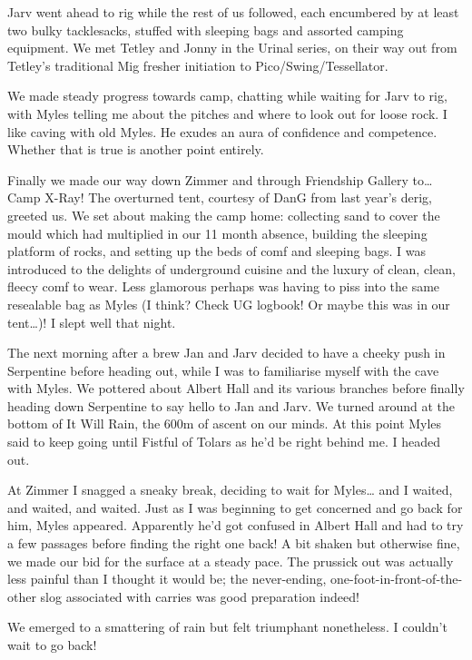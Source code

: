 Jarv went ahead to rig while the rest of us followed, each encumbered by
at least two bulky tacklesacks, stuffed with sleeping bags and assorted
camping equipment. We met Tetley and Jonny in the Urinal series, on
their way out from Tetley's traditional Mig fresher initiation to
Pico/Swing/Tessellator.

We made steady progress towards camp, chatting while waiting for Jarv to
rig, with Myles telling me about the pitches and where to look out for
loose rock. I like caving with old Myles. He exudes an aura of
confidence and competence. Whether that is true is another point
entirely.

Finally we made our way down Zimmer and through Friendship Gallery
to\ldots{} Camp X-Ray! The overturned tent, courtesy of DanG from last
year's derig, greeted us. We set about making the camp home: collecting
sand to cover the mould which had multiplied in our 11 month absence,
building the sleeping platform of rocks, and setting up the beds of comf
and sleeping bags. I was introduced to the delights of underground
cuisine and the luxury of clean, clean, fleecy comf to wear. Less
glamorous perhaps was having to piss into the same resealable bag as
Myles (I think? Check UG logbook! Or maybe this was in our
tent\ldots{})! I slept well that night.

The next morning after a brew Jan and Jarv decided to have a cheeky push
in Serpentine before heading out, while I was to familiarise myself with
the cave with Myles. We pottered about Albert Hall and its various
branches before finally heading down Serpentine to say hello to Jan and
Jarv. We turned around at the bottom of It Will Rain, the 600m of ascent
on our minds. At this point Myles said to keep going until Fistful of
Tolars as he'd be right behind me. I headed out.

At Zimmer I snagged a sneaky break, deciding to wait for Myles\ldots{}
and I waited, and waited, and waited. Just as I was beginning to get
concerned and go back for him, Myles appeared. Apparently he'd got
confused in Albert Hall and had to try a few passages before finding the
right one back! A bit shaken but otherwise fine, we made our bid for the
surface at a steady pace. The prussick out was actually less painful
than I thought it would be; the never-ending,
one-foot-in-front-of-the-other slog associated with carries was good
preparation indeed!

We emerged to a smattering of rain but felt triumphant nonetheless. I
couldn't wait to go back!

